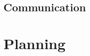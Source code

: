 \documentclass{report}
\begin{document}
	
	\section{Communication} \label{communication}
	
	\chapter{Planning}\label{plan}
	
	
\end{document}
